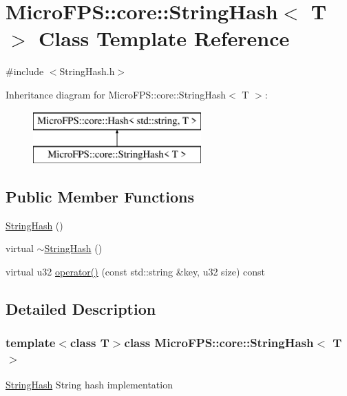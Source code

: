 \hypertarget{class_micro_f_p_s_1_1core_1_1_string_hash}{
\section{MicroFPS::core::StringHash$<$ T $>$ Class Template Reference}
\label{d7/de0/class_micro_f_p_s_1_1core_1_1_string_hash}
}


{\ttfamily \#include $<$StringHash.h$>$}

Inheritance diagram for MicroFPS::core::StringHash$<$ T $>$:\begin{figure}[H]
\begin{center}
\leavevmode
\includegraphics[height=2.000000cm]{d7/de0/class_micro_f_p_s_1_1core_1_1_string_hash}
\end{center}
\end{figure}
\subsection*{Public Member Functions}
\begin{DoxyCompactItemize}
\item 
\hyperlink{class_micro_f_p_s_1_1core_1_1_string_hash_af5add8de04d39822e6dd8605d205bb0e}{StringHash} ()
\item 
virtual \hyperlink{class_micro_f_p_s_1_1core_1_1_string_hash_a980a372c1df942de2ae6e3506877ea00}{$\sim$StringHash} ()
\item 
virtual u32 \hyperlink{class_micro_f_p_s_1_1core_1_1_string_hash_ab5d8c7e696373cfe671bbc58c3135d9c}{operator()} (const std::string \&key, u32 size) const 
\end{DoxyCompactItemize}


\subsection{Detailed Description}
\subsubsection*{template$<$class T$>$class MicroFPS::core::StringHash$<$ T $>$}

\hyperlink{class_micro_f_p_s_1_1core_1_1_string_hash}{StringHash} String hash implementation 

